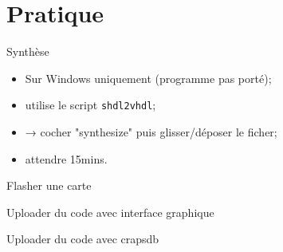 \documentclass{beamer}
\begin{document}
  \section{Pratique}
    \begin{frame}[fragile]{Synthèse}
      \begin{itemize}
        \item Sur Windows uniquement (programme pas porté);
        \item utilise le script \verb+shdl2vhdl+;
        \item → cocher "synthesize" puis glisser/déposer le ficher;
        \item attendre 15mins.
      \end{itemize}
\end{frame}

    \begin{frame}{Flasher une carte}
\end{frame}

    \begin{frame}{Uploader du code avec interface graphique}
\end{frame}

    \begin{frame}{Uploader du code avec crapsdb}
\end{frame}
\end{document}
